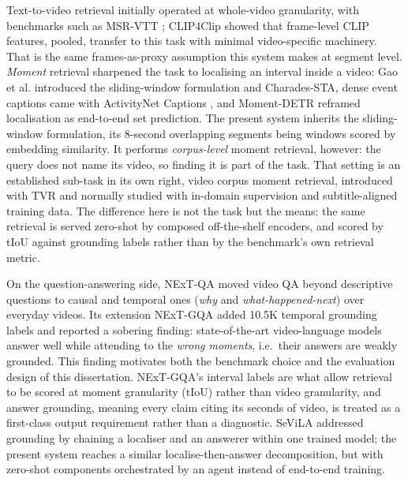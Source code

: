 Text-to-video retrieval initially operated at whole-video granularity,
with benchmarks such as MSR-VTT \autocite{xu2016msrvtt}; CLIP4Clip
\autocite{luo2022clip4clip} showed that frame-level CLIP features,
pooled, transfer to this task with minimal video-specific machinery.
That is the same frames-as-proxy assumption this system makes at segment
level. \emph{Moment} retrieval sharpened the task to localising an
interval inside a video: Gao et al. \autocite{gao2017tall} introduced
the sliding-window formulation and Charades-STA, dense event captions
came with ActivityNet Captions \autocite{krishna2017activitynet}, and
Moment-DETR \autocite{lei2021momentdetr} reframed localisation as
end-to-end set prediction. The present system inherits the
sliding-window formulation, its 8-second overlapping segments being
windows scored by embedding similarity. It performs \emph{corpus-level}
moment retrieval, however: the query does not name its video, so finding
it is part of the task. That setting is an established sub-task in its
own right, video corpus moment retrieval, introduced with TVR
\autocite{lei2020tvr} and normally studied with in-domain supervision
and subtitle-aligned training data. The difference here is not the task
but the means: the same retrieval is served zero-shot by composed
off-the-shelf encoders, and scored by tIoU against grounding labels
rather than by the benchmark's own retrieval metric.

On the question-answering side, NExT-QA \autocite{xiao2021nextqa} moved
video QA beyond descriptive questions to causal and temporal ones
(\emph{why} and \emph{what-happened-next}) over everyday videos. Its
extension NExT-GQA \autocite{xiao2024nextgqa} added 10.5K temporal
grounding labels and reported a sobering finding: state-of-the-art
video-language models answer well while attending to the \emph{wrong
moments}, i.e.~their answers are weakly grounded. This finding motivates
both the benchmark choice and the evaluation design of this
dissertation. NExT-GQA's interval labels are what allow retrieval to be
scored at moment granularity (tIoU) rather than video granularity, and
answer grounding, meaning every claim citing its seconds of video, is
treated as a first-class output requirement rather than a diagnostic.
SeViLA \autocite{yu2023sevila} addressed grounding by chaining a
localiser and an answerer within one trained model; the present system
reaches a similar localise-then-answer decomposition, but with zero-shot
components orchestrated by an agent instead of end-to-end training.

